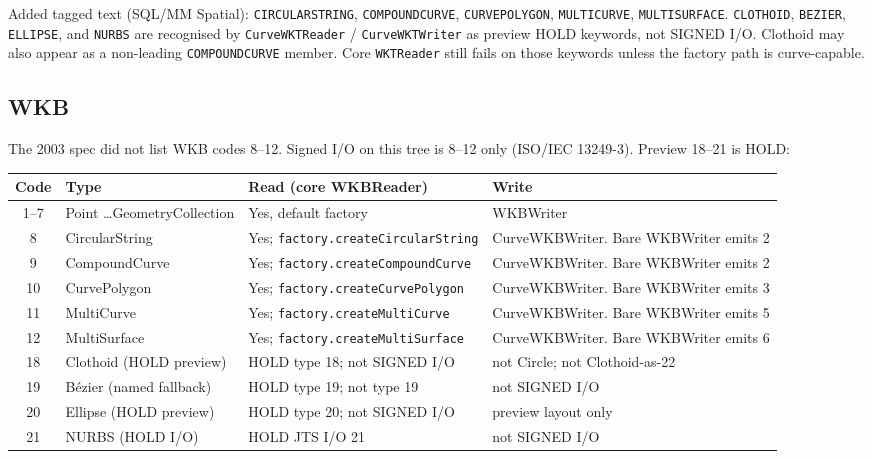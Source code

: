 \documentclass[11pt]{article}
\begin{document}
Added tagged text (SQL/MM Spatial): \texttt{CIRCULARSTRING},
\texttt{COMPOUNDCURVE}, \texttt{CURVEPOLYGON}, \texttt{MULTICURVE},
\texttt{MULTISURFACE}. \texttt{CLOTHOID}, \texttt{BEZIER},
\texttt{ELLIPSE}, and \texttt{NURBS} are recognised by
\texttt{CurveWKTReader} / \texttt{CurveWKTWriter} as preview HOLD
keywords, not SIGNED I/O.
Clothoid may also appear as a non-leading \texttt{COMPOUNDCURVE}
member. Core \texttt{WKTReader} still fails on those keywords unless
the factory path is curve-capable.

\subsection{WKB}
The 2003 spec did not list WKB codes 8--12. Signed I/O on this
tree is 8--12 only (ISO/IEC 13249-3). Preview 18--21 is HOLD:

\begin{center}
\begin{tabular}{clp{4.4cm}p{5.4cm}}
  \toprule
  \textbf{Code} & \textbf{Type} & \textbf{Read (core WKBReader)} &
    \textbf{Write} \\
  \midrule
  1--7 & Point \ldots GeometryCollection &
    Yes, default factory & WKBWriter \\
  8 & CircularString &
    Yes; \texttt{factory.createCircularString} &
    CurveWKBWriter. Bare WKBWriter emits 2 \\
  9 & CompoundCurve &
    Yes; \texttt{factory.createCompoundCurve} &
    CurveWKBWriter. Bare WKBWriter emits 2 \\
  10 & CurvePolygon &
    Yes; \texttt{factory.createCurvePolygon} &
    CurveWKBWriter. Bare WKBWriter emits 3 \\
  11 & MultiCurve &
    Yes; \texttt{factory.createMultiCurve} &
    CurveWKBWriter. Bare WKBWriter emits 5 \\
  12 & MultiSurface &
    Yes; \texttt{factory.createMultiSurface} &
    CurveWKBWriter. Bare WKBWriter emits 6 \\
  18 & Clothoid (HOLD preview) &
    HOLD type 18; not SIGNED I/O & not Circle; not Clothoid-as-22 \\
  19 & B\'ezier (named fallback) &
    HOLD type 19; not type 19 & not SIGNED I/O \\
  20 & Ellipse (HOLD preview) &
    HOLD type 20; not SIGNED I/O & preview layout only \\
  21 & NURBS (HOLD I/O) &
    HOLD JTS I/O 21 & not SIGNED I/O \\
  \bottomrule
\end{tabular}
\end{center}
\end{document}
